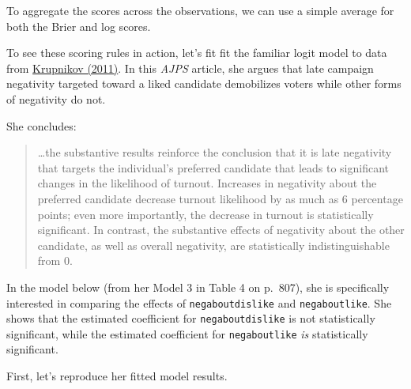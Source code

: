 \documentclass[
]{book}
\begin{document}
To aggregate the scores across the observations, we can use a simple average for both the Brier and log scores.

To see these scoring rules in action, let's fit fit the familiar logit model to data from \href{https://onlinelibrary.wiley.com/doi/10.1111/j.1540-5907.2011.00522.x}{Krupnikov (2011)}. In this \emph{AJPS} article, she argues that late campaign negativity targeted toward a liked candidate demobilizes voters while other forms of negativity do not.

She concludes:

\begin{quote}
\ldots the substantive results reinforce the conclusion that it is late negativity that targets the individual's preferred candidate that leads to significant changes in the likelihood of turnout. Increases in negativity about the preferred candidate decrease turnout likelihood by as much as 6 percentage points; even more importantly, the decrease in turnout is statistically significant. In contrast, the substantive effects of negativity about the other candidate, as well as overall negativity, are statistically indistinguishable from 0.
\end{quote}

In the model below (from her Model 3 in Table 4 on p.~807), she is specifically interested in comparing the effects of \texttt{negaboutdislike} and \texttt{negaboutlike}. She shows that the estimated coefficient for \texttt{negaboutdislike} is not statistically significant, while the estimated coefficient for \texttt{negaboutlike} \emph{is} statistically significant.

First, let's reproduce her fitted model results.
\end{document}
